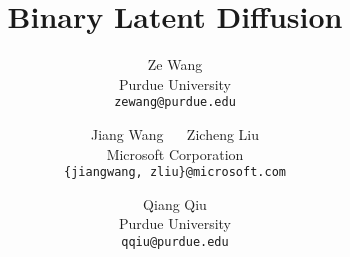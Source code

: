 \documentclass[10pt,twocolumn,letterpaper]{article}
\begin{document}
\title{Binary Latent Diffusion}


\author{Ze Wang \\
Purdue University \\
\texttt{{\small zewang@purdue.edu}} \\
\and
Jiang Wang $\quad$ Zicheng Liu\\
Microsoft Corporation \\
\texttt{{\small\{jiangwang, zliu\}@microsoft.com}} \\
\and
Qiang Qiu \\
Purdue University \\
\texttt{{\small qqiu@purdue.edu}} \\
}
\maketitle
\end{document}
